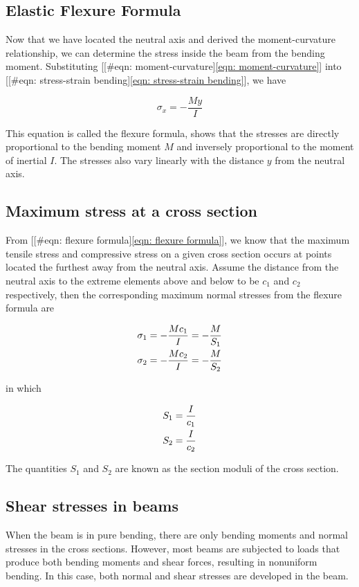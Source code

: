 \documentclass[a4paper,openany,12pt]{book}
\begin{document}
\subsection{Elastic Flexure Formula}
\label{elastic-flexure-formula}
Now that we have located the neutral axis and derived the
moment-curvature relationship, we can determine the stress inside the
beam from the bending moment. Substituting
[[\#eqn: moment-curvature]\ref{eqn: moment-curvature}] into
[[\#eqn: stress-strain bending]\ref{eqn: stress-strain bending}], we have

$$ \sigma_x =  - \frac{My}{I}$$

This equation is called the flexure formula, shows that the stresses are
directly proportional to the bending moment \(M\) and inversely
proportional to the moment of inertial \(I\). The stresses also vary
linearly with the distance \(y\) from the neutral axis.

\subsection{Maximum stress at a cross section}
\label{maximum-stress-at-a-cross-section}
From [[\#eqn: flexure formula]\ref{eqn: flexure formula}], we know that the
maximum tensile stress and compressive stress on a given cross section
occurs at points located the furthest away from the neutral axis. Assume
the distance from the neutral axis to the extreme elements above and
below to be \(c_1\) and \(c_2\) respectively, then the corresponding maximum
normal stresses from the flexure formula are

\begin{gather}
\label{eqn: section modulus}
  \sigma _1 =  - \frac{Mc_1}{I} =  - \frac{M}{S_1} \hfill \\
  \sigma _2 =  - \frac{Mc_2}{I} =  - \frac{M}{S_2} \hfill \\ 
\end{gather}

in which

$$\begin{gathered}
  S_1 = \frac{I}{c_1} \hfill \\
  S_2 = \frac{I}{c_2} \hfill \\ 
\end{gathered}$$

The quantities \(S_1\) and \(S_2\) are known as the section moduli of the
cross section.

\subsection{Shear stresses in beams}
\label{shear-stresses-in-beams}
When the beam is in pure bending, there are only bending moments and
normal stresses in the cross sections. However, most beams are subjected
to loads that produce both bending moments and shear forces, resulting
in nonuniform bending. In this case, both normal and shear stresses are
developed in the beam.
\end{document}

